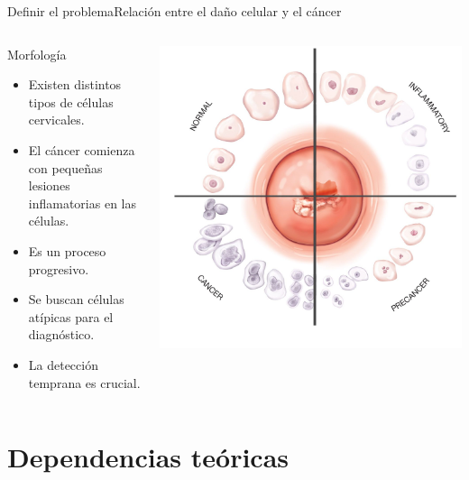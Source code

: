 \documentclass[aspectratio=169,10pt]{beamer}
\begin{document}
\begin{frame}{Definir el problema}{Relación entre el daño celular y el cáncer}
  \begin{columns}
    \begin{exampleblock}{Morfología}
      \begin{itemize}
        \item Existen distintos tipos de células cervicales.
        \item El cáncer comienza con pequeñas lesiones inflamatorias en las células.
        \item Es un proceso progresivo.
        \item Se buscan células atípicas para el diagnóstico.
        \item La detección temprana es crucial.
      \end{itemize}
    \end{exampleblock}
    \includegraphics[width=\columnwidth]{ciclo.jpg}
  \end{columns}
\end{frame}

\section{Dependencias teóricas}
\end{document}
